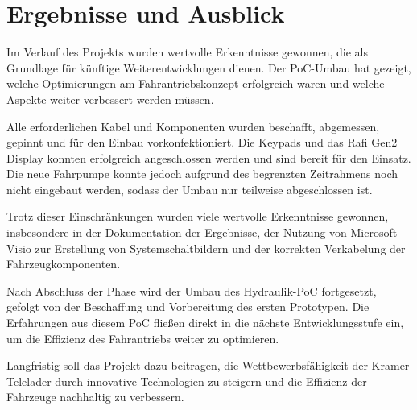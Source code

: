 \documentclass[a4paper, 12pt]{article} %
\begin{document}
\section{Ergebnisse und Ausblick}
\begin{spacing}{1.5}  %
    \fontsize{14pt}{14pt}\selectfont  %

    Im Verlauf des Projekts wurden wertvolle Erkenntnisse gewonnen, die als Grundlage für künftige Weiterentwicklungen dienen. Der \acf{PoC}-Umbau hat gezeigt, welche Optimierungen am Fahrantriebskonzept erfolgreich waren und welche Aspekte weiter verbessert werden müssen.

    Alle erforderlichen Kabel und Komponenten wurden beschafft, abgemessen, gepinnt und für den Einbau vorkonfektioniert. Die Keypads und das Rafi Gen2 Display konnten erfolgreich angeschlossen werden und sind bereit für den Einsatz. Die neue Fahrpumpe konnte jedoch aufgrund des begrenzten Zeitrahmens noch nicht eingebaut werden, sodass der Umbau nur teilweise abgeschlossen ist.

    Trotz dieser Einschränkungen wurden viele wertvolle Erkenntnisse gewonnen, insbesondere in der Dokumentation der Ergebnisse, der Nutzung von Microsoft Visio zur Erstellung von Systemschaltbildern und der korrekten Verkabelung der Fahrzeugkomponenten.

    Nach Abschluss der Phase wird der Umbau des Hydraulik-\acs{PoC} fortgesetzt, gefolgt von der Beschaffung und Vorbereitung des ersten Prototypen. Die Erfahrungen aus diesem \acs{PoC} fließen direkt in die nächste Entwicklungsstufe ein, um die Effizienz des Fahrantriebs weiter zu optimieren.

    Langfristig soll das Projekt dazu beitragen, die Wettbewerbsfähigkeit der Kramer Telelader durch innovative Technologien zu steigern und die Effizienz der Fahrzeuge nachhaltig zu verbessern.
\end{spacing}



\clearpage

\begingroup
\renewcommand{\bibfont}{\fontsize{13pt}{12pt}\selectfont}  
\sloppy
\nocite{*}
\begin{spacing}{1.5}  %
\fontsize{14pt}{14pt}\selectfont  %
\printbibliography{}
\end{spacing}
\end{document}
